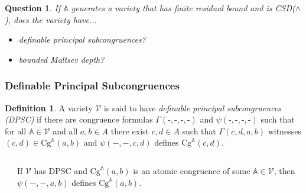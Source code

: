 \documentclass[compress,handout]{beamer}
\newcommand{\V}{\mathcal{V}}
\newcommand{\A}{\mathbb{A}}
\theoremstyle{plain} \newtheorem{thm}{Theorem}
\theoremstyle{definition} \newtheorem{defn}[thm]{Definition}
\theoremstyle{remark} \newtheorem*{rk}{Remark}
\theoremstyle{plain} \newtheorem*{question}{Question}
\newcommand{\Cg}{\text{Cg}}
\newcommand{\Con}{\text{Con}}
\begin{document}
\begin{frame}
\begin{question}
If $\A$ generates a variety that has finite residual bound and is
CSD($\wedge$), does the variety have...
\begin{itemize}
  \item definable principal subcongruences?
  \item bounded Maltsev depth?
\end{itemize}
\end{question}
\end{frame}

\begin{frame} \frametitle{Definable Principal Subcongruences}
\vspace{-2ex}
\begin{defn}
A variety $\V$ is said to have \emph{definable principal subcongruences
(DPSC)} if there are congruence formulas
$\Gamma(\text{-},\text{-},\text{-},\text{-})$ and
$\psi(\text{-},\text{-},\text{-},\text{-})$ such that for all $\A\in \V$ and
all $a,b\in A$ there exist $c,d\in A$ such that $\Gamma(c,d,a,b)$ witnesses
$(c,d)\in \Cg^{\A}(a,b)$ and $\psi(-,-,c,d)$ defines $\Cg^{\A}(c,d)$.
\end{defn}

\vfill

\begin{columns}
\begin{column}{0.37\textwidth}
\end{column}

\pause

\begin{column}{0.63\textwidth}
If $\V$ has DPSC and $\Cg^{\A}(a,b)$ is an atomic congruence of some $\A\in
\V$, then $\psi(-,-,a,b)$ defines $\Cg^{\A}(a,b)$.
\end{column}
\end{columns}
\end{frame}
\end{document}
